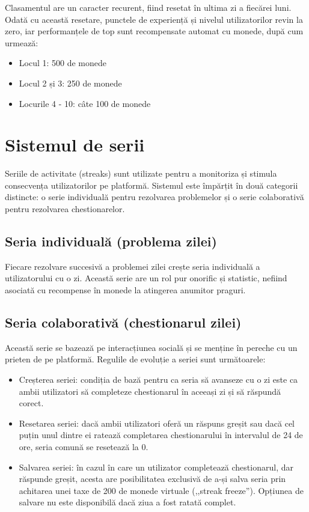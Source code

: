 Clasamentul are un caracter recurent, fiind resetat în ultima zi a fiecărei luni. Odată cu această resetare, punctele de experiență și nivelul utilizatorilor revin la zero, iar performanțele de top sunt recompensate automat cu monede, după cum urmează:

\begin{itemize}
    \item Locul 1: 500 de monede
    \item Locul 2 și 3: 250 de monede
    \item Locurile 4 - 10: câte 100 de monede
\end{itemize}

\section{Sistemul de serii}

Seriile de activitate (streaks) sunt utilizate pentru a monitoriza și stimula consecvența utilizatorilor pe platformă. Sistemul este împărțit în două categorii distincte: o serie individuală pentru rezolvarea problemelor și o serie colaborativă pentru rezolvarea chestionarelor.

\subsection{Seria individuală (problema zilei)}

Fiecare rezolvare succesivă a problemei zilei crește seria individuală a utilizatorului cu o zi. Această serie are un rol pur onorific și statistic, nefiind asociată cu recompense în monede la atingerea anumitor praguri.

\subsection{Seria colaborativă (chestionarul zilei)}

Această serie se bazează pe interacțiunea socială și se menține în pereche cu un prieten de pe platformă. Regulile de evoluție a seriei sunt următoarele:

\begin{itemize}
    \item Creșterea seriei: condiția de bază pentru ca seria să avanseze cu o zi este ca ambii utilizatori să completeze chestionarul în aceeași zi și să răspundă corect.
    \item Resetarea seriei: dacă ambii utilizatori oferă un răspuns greșit sau dacă cel puțin unul dintre ei ratează completarea chestionarului în intervalul de 24 de ore, seria comună se resetează la 0.
    \item Salvarea seriei: în cazul în care un utilizator completează chestionarul, dar răspunde greșit, acesta are posibilitatea exclusivă de a-și salva seria prin achitarea unei taxe de 200 de monede virtuale (,,streak freeze''). Opțiunea de salvare nu este disponibilă dacă ziua a fost ratată complet.
\end{itemize}

